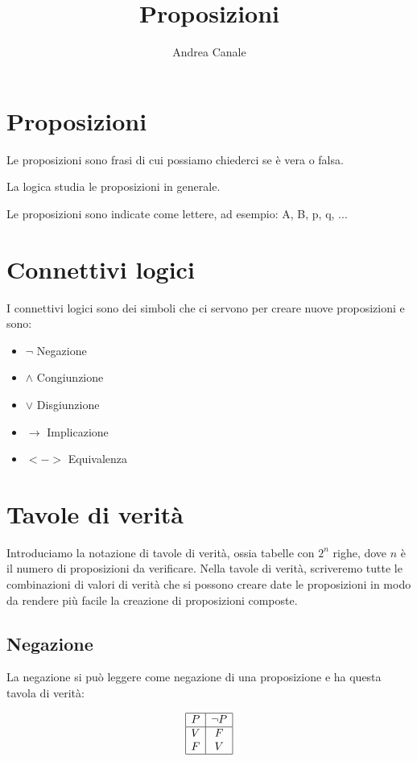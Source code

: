 \documentclass{article}
\title{Proposizioni}
\author{Andrea Canale}
\begin{document}
	
\section{Proposizioni}

Le proposizioni sono frasi di cui possiamo chiederci se è vera o falsa.

La logica studia le proposizioni in generale.

Le proposizioni sono indicate come lettere, ad esempio: A, B, p, q, ...

\section{Connettivi logici}

I connettivi logici sono dei simboli che ci servono per creare nuove proposizioni e sono:

\begin{itemize}
	\item $ \neg $ Negazione
	\item $ \land $ Congiunzione
	\item $ \lor $ Disgiunzione
	\item $ \rightarrow $ Implicazione
	\item $ <-> $ Equivalenza
\end{itemize}

\section{Tavole di verità}

Introduciamo la notazione di tavole di verità, ossia tabelle con $ 2^n $ righe, dove $n$ è il numero di proposizioni da verificare. Nella tavole di verità, scriveremo tutte le combinazioni di valori di verità che si possono creare date le proposizioni in modo da rendere più facile la creazione di proposizioni composte.

\subsection{Negazione}

La negazione si può leggere come negazione di una proposizione e ha questa tavola di verità:

\[
\begin{array}{|c|c|}
	\hline
	P & \neg P \\
	\hline
	V & F \\
	F & V \\
	\hline
\end{array}
\]
\end{document}

